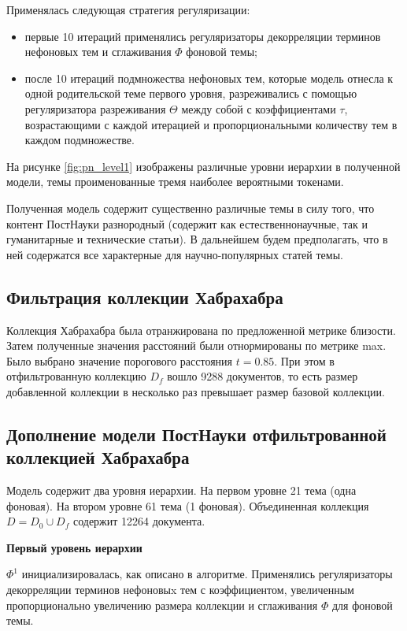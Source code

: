 Применялась следующая стратегия регуляризации: 
\begin{itemize} \item первые 10 итераций применялись регуляризаторы декорреляции терминов нефоновых тем и сглаживания $\Phi$ фоновой темы;

\item после 10 итераций подмножества нефоновых тем, которые модель отнесла к одной родительской теме первого уровня, разреживались с помощью регуляризатора разреживания $\Theta$ между собой с коэффициентами $\tau$, возрастающими с каждой итерацией и пропорциональными количеству тем в каждом подмножестве.
\end{itemize}

На рисунке \ref{fig:pn_level1} изображены различные уровни иерархии в полученной модели, темы проименованные тремя наиболее вероятными токенами.

Полученная модель содержит существенно различные темы в силу того, что контент ПостНауки разнородный (содержит как естественнонаучные, так и гуманитарные и технические статьи). В дальнейшем будем предполагать, что в ней содержатся все характерные для научно-популярных статей темы. 

\subsection{Фильтрация коллекции Хабрахабра} 
Коллекция Хабрахабра была отранжирована по предложенной метрике близости. Затем полученные значения расстояний были отнормированы по метрике max. Было выбрано значение порогового расстояния $t = 0.85$. При этом в отфильтрованную коллекцию $D_f$ вошло 9288 документов, то есть размер добавленной коллекции в несколько раз превышает размер базовой коллекции. 


\subsection{Дополнение модели ПостНауки отфильтрованной коллекцией Хабрахабра}
Модель содержит два уровня иерархии. На первом уровне 21 тема (одна фоновая). На втором уровне 61 тема (1 фоновая).
Объединенная коллекция $D = D_0 \cup D_f$ содержит 12264 документа. 

\textbf{Первый уровень иерархии} 

$\Phi^1$ инициализировалась, как описано в алгоритме.
Применялись регуляризаторы декорреляции терминов нефоновыx тем с коэффициентом, увеличенным пропорционально увеличению размера коллекции и сглаживания $\Phi$ для фоновой темы.

